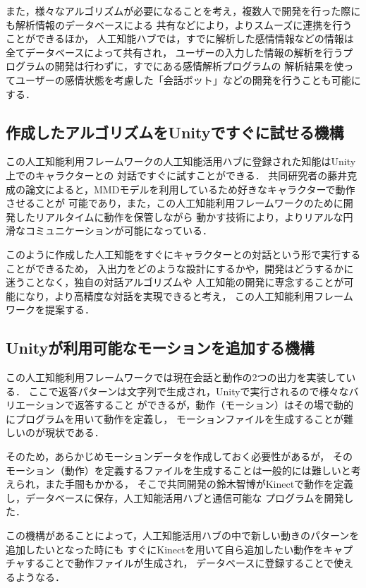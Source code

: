 また，様々なアルゴリズムが必要になることを考え，複数人で開発を行った際にも解析情報のデータベースによる
共有などにより，よりスムーズに連携を行うことができるほか，
人工知能ハブでは，すでに解析した感情情報などの情報は全てデータベースによって共有され，
ユーザーの入力した情報の解析を行うプログラムの開発は行わずに，すでにある感情解析プログラムの
解析結果を使ってユーザーの感情状態を考慮した「会話ボット」などの開発を行うことも可能にする．\\
\subsection{作成したアルゴリズムをUnityですぐに試せる機構}
この人工知能利用フレームワークの人工知能活用ハブに登録された知能はUnity上でのキャラクターとの
対話ですぐに試すことができる．
共同研究者の藤井克成の論文\cite{fuji}によると，MMDモデルを利用しているため好きなキャラクターで動作させることが
可能であり，また，この人工知能利用フレームワークのために開発したリアルタイムに動作を保管しながら
動かす技術により，よりリアルな円滑なコミュニケーションが可能になっている．

このように作成した人工知能をすぐにキャラクターとの対話という形で実行することができるため，
入出力をどのような設計にするかや，開発はどうするかに迷うことなく，独自の対話アルゴリズムや
人工知能の開発に専念することが可能になり，より高精度な対話を実現できると考え，
この人工知能利用フレームワークを提案する．

\subsection{Unityが利用可能なモーションを追加する機構}
この人工知能利用フレームワークでは現在会話と動作の2つの出力を実装している．
ここで返答パターンは文字列で生成され，Unityで実行されるので様々なバリエーションで返答すること
ができるが，動作（モーション）はその場で動的にプログラムを用いて動作を定義し，
モーションファイルを生成することが難しいのが現状である．

そのため，あらかじめモーションデータを作成しておく必要性があるが，
そのモーション（動作）を定義するファイルを生成することは一般的には難しいと考えられ，また手間もかかる，
そこで共同開発の鈴木智博がKinectで動作を定義し，データベースに保存，人工知能活用ハブと通信可能な
プログラムを開発した\cite{suzuki}．

この機構があることによって，人工知能活用ハブの中で新しい動きのパターンを追加したいとなった時にも
すぐにKinectを用いて自ら追加したい動作をキャプチャすることで動作ファイルが生成され，
データベースに登録することで使えるようなる．

